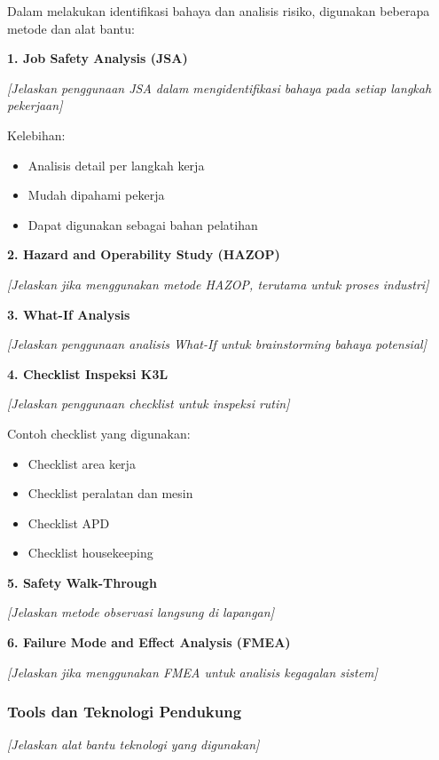 Dalam melakukan identifikasi bahaya dan analisis risiko, digunakan beberapa metode dan alat bantu:

\textbf{1. Job Safety Analysis (JSA)}

\textit{[Jelaskan penggunaan JSA dalam mengidentifikasi bahaya pada setiap langkah pekerjaan]}

Kelebihan:
\begin{itemize}
    \item Analisis detail per langkah kerja
    \item Mudah dipahami pekerja
    \item Dapat digunakan sebagai bahan pelatihan
\end{itemize}

\textbf{2. Hazard and Operability Study (HAZOP)}

\textit{[Jelaskan jika menggunakan metode HAZOP, terutama untuk proses industri]}

\textbf{3. What-If Analysis}

\textit{[Jelaskan penggunaan analisis What-If untuk brainstorming bahaya potensial]}

\textbf{4. Checklist Inspeksi K3L}

\textit{[Jelaskan penggunaan checklist untuk inspeksi rutin]}

Contoh checklist yang digunakan:
\begin{itemize}
    \item Checklist area kerja
    \item Checklist peralatan dan mesin
    \item Checklist APD
    \item Checklist housekeeping
\end{itemize}

\textbf{5. Safety Walk-Through}

\textit{[Jelaskan metode observasi langsung di lapangan]}

\textbf{6. Failure Mode and Effect Analysis (FMEA)}

\textit{[Jelaskan jika menggunakan FMEA untuk analisis kegagalan sistem]}

\vspace{0.5cm}

\subsubsection{Tools dan Teknologi Pendukung}

\textit{[Jelaskan alat bantu teknologi yang digunakan]}

